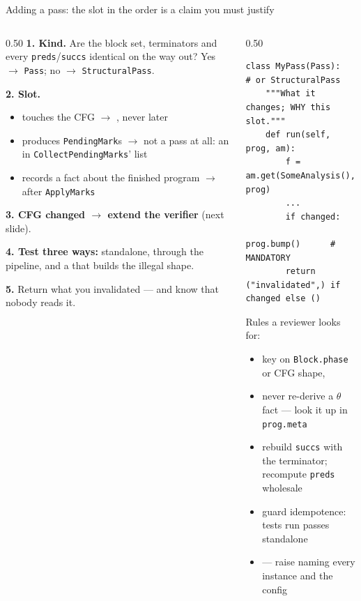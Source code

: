 \begin{frame}[fragile]{Adding a pass: the slot in the order is a claim you must justify}
\begin{columns}[T]
\begin{column}{0.50\textwidth}
\scriptsize
\textbf{1. Kind.} Are the block set, terminators and every
\texttt{preds}/\texttt{succs} identical on the way out? Yes $\to$ \texttt{Pass};
no $\to$ \texttt{StructuralPass}.

\textbf{2. Slot.}
\begin{itemize}\itemsep1pt
  \item touches the CFG $\to$ , never later
  \item produces \texttt{PendingMark}s $\to$ not a pass at all: an  in
        \texttt{CollectPendingMarks}' list
  \item records a fact about the finished program $\to$ after \texttt{ApplyMarks}
\end{itemize}

\textbf{3. CFG changed $\to$ extend the verifier} (next slide).

\textbf{4. Test three ways:} standalone, through the pipeline, and a
 that builds the illegal shape.

\textbf{5.} Return what you invalidated --- and know that nobody reads it.
\end{column}
\begin{column}{0.50\textwidth}
\begin{lstlisting}[style=py]
class MyPass(Pass):          # or StructuralPass
    """What it changes; WHY this slot."""
    def run(self, prog, am):
        f = am.get(SomeAnalysis(), prog)
        ...
        if changed:
            prog.bump()      # MANDATORY
        return ("invalidated",) if changed else ()
\end{lstlisting}
\scriptsize
Rules a reviewer looks for:
\begin{itemize}\itemsep1pt
  \item key on \texttt{Block.phase} or CFG shape, 
  \item never re-derive a $\theta$ fact --- look it up in \texttt{prog.meta}
  \item rebuild \texttt{succs} with the terminator; recompute \texttt{preds} wholesale
  \item guard idempotence: tests run passes standalone
  \item {} --- raise naming every instance and the config
\end{itemize}
\end{column}
\end{columns}
\end{frame}
